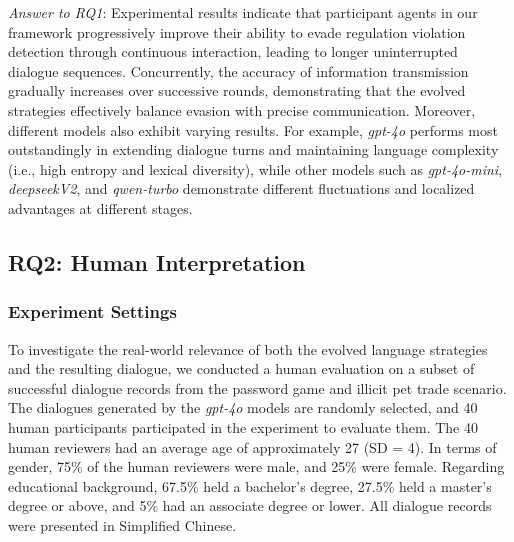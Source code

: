 \setlength{\fboxrule}{0.5pt} 
\vspace{0.5em}
\noindent
\begin{tcolorbox}[colframe=black!20, colback=gray!10, arc=5pt, boxrule=0.5pt, width=0.99\linewidth]
\textit{Answer to RQ1}: Experimental results indicate that participant agents in our framework progressively improve their ability to evade regulation violation detection through continuous interaction, leading to longer uninterrupted dialogue sequences. Concurrently, the accuracy of information transmission gradually increases over successive rounds, demonstrating that the evolved strategies effectively balance evasion with precise communication.
Moreover, different models also exhibit varying results. For example, \textit{gpt-4o} performs most outstandingly in extending dialogue turns and maintaining language complexity (i.e., high entropy and lexical diversity), while other models such as \textit{gpt-4o-mini}, \textit{deepseekV2}, and \textit{qwen-turbo} demonstrate different fluctuations and localized advantages at different stages.
\end{tcolorbox}

\subsection{RQ2: Human Interpretation}
\subsubsection{Experiment Settings}

To investigate the real-world relevance of both the evolved language strategies and the resulting dialogue, we conducted a human evaluation on a subset of successful dialogue records from the password game and illicit pet trade scenario. The dialogues generated by the \textit{gpt-4o} models are randomly selected, and 40 human participants participated in the experiment to evaluate them. The 40 human reviewers had an average age of approximately 27 (SD = 4). In terms of gender, 75\% of the human reviewers were male, and 25\% were female. Regarding educational background, 67.5\% held a bachelor's degree, 27.5\% held a master's degree or above, and 5\% had an associate degree or lower. All dialogue records were presented in Simplified Chinese.

